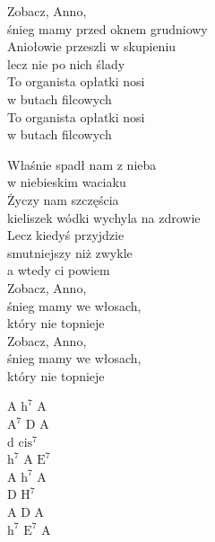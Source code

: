 \begin{text}
    Zobacz, Anno,\\
    śnieg mamy przed oknem grudniowy\\
    Aniołowie przeszli w skupieniu\\
    lecz nie po nich ślady\\
    To organista opłatki nosi\\
    w butach filcowych\\
    To organista opłatki nosi\\
    w butach filcowych

    Właśnie spadł nam z nieba\\
    w niebieskim waciaku\\
    Życzy nam szczęścia\\
    kieliszek wódki wychyla na zdrowie\\
    Lecz kiedyś przyjdzie\\
    smutniejszy niż zwykle\\
    a wtedy ci powiem\\
    Zobacz, Anno,\\
    śnieg mamy we włosach,\\
    który nie topnieje\\
    Zobacz, Anno,\\
    śnieg mamy we włosach,\\
    który nie topnieje
\end{text}
\begin{chord}
    A $\mathrm{h^7}$ A\\
    $\mathrm{A^7}$ D A\\
    d $\mathrm{cis^7}$\\
    $\mathrm{h^7}$ A $\mathrm{E^7}$\\
    A $\mathrm{h^7}$ A\\
    D $\mathrm{H^7}$\\
    A D A\\
    $\mathrm{h^7}$ $\mathrm{E^7}$ A
\end{chord}
